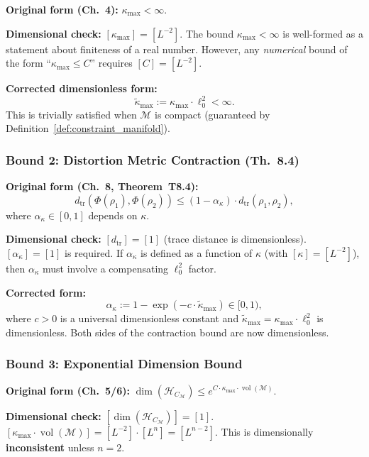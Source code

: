 \documentclass[11pt,a4paper]{article}
\theoremstyle{remark}
\newcommand{\CM}{\mathcal{M}}
\newcommand{\HC}{\mathcal{H}_C}
\DeclareMathOperator{\vol}{vol}
\begin{document}
\noindent\textbf{Original form (Ch.~4):}
$\kappa_{\max} < \infty$.

\noindent\textbf{Dimensional check:}
$[\kappa_{\max}] = [L^{-2}]$.  The bound $\kappa_{\max} < \infty$ is
well-formed as a statement about finiteness of a real number.  However,
any \emph{numerical} bound of the form ``$\kappa_{\max} \leq C$''
requires $[C] = [L^{-2}]$.

\noindent\textbf{Corrected dimensionless form:}
\begin{equation}
\label{eq:kappa_bound}
  \boxed{
    \tilde{\kappa}_{\max}
    := \kappa_{\max} \cdot \ell_0^2
    < \infty.
  }
\end{equation}
This is trivially satisfied when $\CM$ is compact (guaranteed by
Definition~\ref{def:constraint_manifold}).

\subsubsection{Bound 2: Distortion Metric Contraction (Th.~8.4)}

\noindent\textbf{Original form (Ch.~8, Theorem~T8.4):}
\[
  d_{\mathrm{tr}}(\Phi(\rho_1), \Phi(\rho_2))
  \leq
  (1 - \alpha_\kappa) \cdot d_{\mathrm{tr}}(\rho_1, \rho_2),
\]
where $\alpha_\kappa \in [0,1]$ depends on $\kappa$.

\noindent\textbf{Dimensional check:}
$[d_{\mathrm{tr}}] = [1]$ (trace distance is dimensionless).
$[\alpha_\kappa] = [1]$ is required.  If $\alpha_\kappa$ is defined as
a function of $\kappa$ (with $[\kappa] = [L^{-2}]$), then
$\alpha_\kappa$ must involve a compensating $\ell_0^2$ factor.

\noindent\textbf{Corrected form:}
\begin{equation}
\label{eq:contraction}
  \alpha_\kappa
  := 1 - \exp(-c \cdot \tilde{\kappa}_{\max})
  \in [0,1),
\end{equation}
where $c > 0$ is a universal dimensionless constant and
$\tilde{\kappa}_{\max} = \kappa_{\max} \cdot \ell_0^2$ is
dimensionless.  Both sides of the contraction bound are now
dimensionless.

\subsubsection{Bound 3: Exponential Dimension Bound}

\noindent\textbf{Original form (Ch.~5/6):}
$\dim(\HC_\CM) \leq e^{C \cdot \kappa_{\max} \cdot \vol(\CM)}$.

\noindent\textbf{Dimensional check:}
$[\dim(\HC_\CM)] = [1]$.
$[\kappa_{\max} \cdot \vol(\CM)] = [L^{-2}] \cdot [L^n] = [L^{n-2}]$.
This is dimensionally \textbf{inconsistent} unless $n = 2$.
\end{document}
